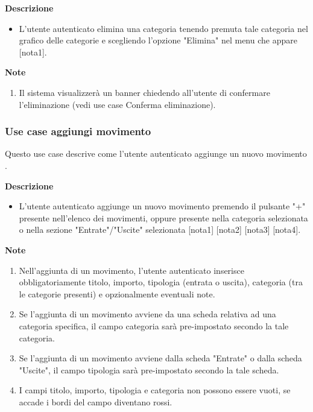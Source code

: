 \documentclass[a4paper,12pt]{article}
\begin{document}
\textbf{Descrizione}
\begin{itemize} \setlength\itemsep{0.01em}
\item L'utente autenticato elimina una categoria tenendo premuta tale categoria nel grafico delle categorie e scegliendo l'opzione "Elimina" nel menu che appare [nota1].
\end{itemize}

\textbf{Note}
\begin{enumerate} \setlength\itemsep{0.01em}
\item Il sistema visualizzerà un banner chiedendo all'utente di confermare l'eliminazione  (vedi use case Conferma eliminazione).
\end{enumerate}



\subsubsection*{Use case aggiungi movimento}

Questo use case descrive come l'utente autenticato aggiunge un nuovo movimento .

\textbf{Descrizione}
\begin{itemize} \setlength\itemsep{0.01em}
\item L'utente autenticato aggiunge un nuovo movimento premendo il pulsante "+" presente nell'elenco dei movimenti, oppure presente nella categoria selezionata o nella sezione "Entrate"/"Uscite" selezionata [nota1] [nota2] [nota3] [nota4].
\end{itemize}

\textbf{Note}
\begin{enumerate} \setlength\itemsep{0.01em}
\item Nell'aggiunta di un movimento, l'utente autenticato inserisce obbligatoriamente titolo, importo, tipologia (entrata o uscita), categoria (tra le categorie presenti) e opzionalmente eventuali note.
\item Se l'aggiunta di un movimento avviene da una scheda relativa ad una categoria specifica, il campo categoria sarà pre-impostato secondo la tale categoria.
\item Se l'aggiunta di un movimento avviene dalla scheda "Entrate" o dalla scheda "Uscite", il campo tipologia sarà pre-impostato secondo la tale scheda.
\item I campi titolo, importo, tipologia e categoria non possono essere vuoti, se accade i bordi del campo diventano rossi.
\end{enumerate}
\end{document}
